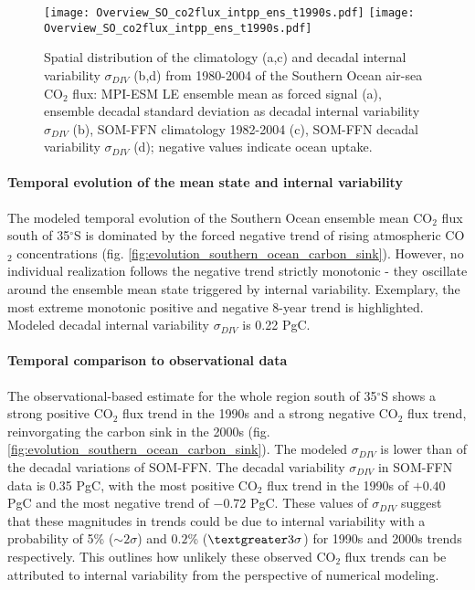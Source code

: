 \documentclass[12pt]{article}
\begin{document}
\begin{figure}%
	\centering
	\texttt{[image: Overview\_SO\_co2flux\_intpp\_ens\_t1990s.pdf]} %
	\texttt{[image: Overview\_SO\_co2flux\_intpp\_ens\_t1990s.pdf]} %
	\caption{Spatial distribution of the climatology (a,c) and decadal internal variability $\sigma_{DIV}$ (b,d) from 1980-2004 of the Southern Ocean air-sea CO$_2$ flux: MPI-ESM LE ensemble mean as forced signal (a), ensemble decadal standard deviation as decadal internal variability $\sigma_{DIV}$ (b), SOM-FFN climatology 1982-2004 (c), SOM-FFN decadal variability $\sigma_{DIV}$ (d); negative values indicate ocean uptake.}
	\label{fig:SOCS_ensmean_ensstd}
\end{figure}


\paragraph{Temporal evolution of the mean state and internal variability}
The modeled temporal evolution of the Southern Ocean ensemble mean CO$_2$ flux south of 35$^\circ$S is dominated by the forced negative trend of rising atmospheric CO$_2$ concentrations (fig. \ref{fig:evolution_southern_ocean_carbon_sink}). However, no individual realization follows the negative trend strictly monotonic - they oscillate around the ensemble mean state triggered by internal variability. Exemplary, the most extreme monotonic positive and negative 8-year trend is highlighted. Modeled decadal internal variability $\sigma_{DIV}$ is 0.22 PgC. 



\paragraph{Temporal comparison to observational data} 
The observational-based estimate for the whole region south of 35$^\circ$S shows a strong positive CO$_2$ flux trend in the 1990s \citep{LeQuere2007} and a strong negative CO$_2$ flux trend, reinvorgating the carbon sink in the 2000s  \citep{landschuetzer2015} (fig. \ref{fig:evolution_southern_ocean_carbon_sink}). 
The modeled $\sigma_{DIV}$ is lower than of the decadal variations of SOM-FFN. The decadal variability $\sigma_{DIV}$ in SOM-FFN data is 0.35 PgC, with the most positive CO$_2$ flux trend in the 1990s of $+0.40$ PgC and the most negative trend  of $-0.72$ PgC. These values of $\sigma_{DIV}$ suggest that these magnitudes in trends could be due to internal variability with a probability of 5\% ($\sim2\sigma$) and $0.2$\% ($\textgreater3\sigma$) for 1990s and 2000s trends respectively. This outlines how unlikely these observed CO$_2$ flux trends can be attributed to internal variability from the perspective of numerical modeling.   
\end{document}
